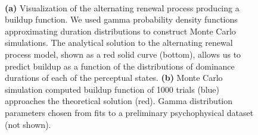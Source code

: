 \documentclass{frontiersSCNS} %
\begin{document}
\begin{figure}
	\centering
	
	   \\
	  \vspace{20 pt}
   
	\caption{\textbf{(a)} Visualization of the alternating renewal process producing a buildup function. We used gamma probability density functions approximating duration distributions to construct Monte Carlo simulations. The analytical solution to the alternating renewal process model, shown as a red solid curve (bottom), allows us to predict buildup as a function of the distributions of dominance durations of each of the perceptual states. \textbf{(b)} Monte Carlo simulation computed buildup function of 1000 trials (blue) approaches the theoretical solution (red). Gamma distribution parameters chosen from fits to a preliminary psychophysical dataset (not shown).}
	\label{fig:makingBUFs}
\end{figure}
\end{document}
